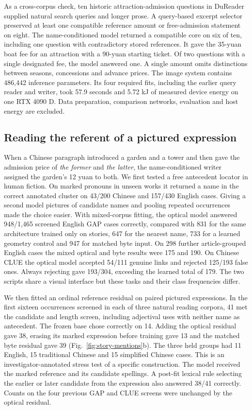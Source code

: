 \documentclass[12pt,a4paper]{article}
\providecommand{\DIFadd}[1]{{\protect\color{blue} \sf #1}} %
\begin{document}
\DIFadd{As a cross-corpus check, ten historic attraction-admission questions in DuReader supplied natural search queries and longer prose. A query-based excerpt selector preserved at least one compatible reference amount or free-admission statement on eight. The name-conditioned model returned a compatible core on six of ten, including one question with contradictory stored references. It gave the 35-yuan boat fee for an attraction with a 90-yuan starting ticket. Of two questions with a single designated fee, the model answered one. A single amount omits distinctions between seasons, concessions and advance prices. The image system contains 486,442 inference parameters. Its four required fits, including the earlier query reader and writer, took 57.9 seconds and 5.72 kJ of measured device energy on one RTX 4090 D. Data preparation, comparison networks, evaluation and host energy are excluded.
}

\subsection*{\DIFadd{Reading the referent of a pictured expression}}
\DIFadd{When a Chinese paragraph introduced a garden and a tower and then gave the admission price of \emph{the former} and \emph{the latter}, the name-conditioned writer assigned the garden's 12 yuan to both. We first tested a free antecedent locator in human fiction. On marked pronouns in unseen works it returned a name in the correct annotated cluster on 43/200 Chinese and 157/430 English cases. Giving a second model pictures of candidate names and pooling repeated occurrences made the choice easier. With mixed-corpus fitting, the optical model answered 948/1,465 screened English GAP cases correctly, compared with 831 for the same architecture trained only on stories, 647 for the nearest name, 733 for a learned geometry control and 947 for matched byte input. On 298 further article-grouped English cases the mixed optical and byte results were 175 and 190. On Chinese CLUE the optical model accepted 54/111 genuine links and rejected 125/193 false ones. Always rejecting gave 193/304, exceeding the learned total of 179. The two scripts share a visual interface but these tasks and their class frequencies differ.
}

\DIFadd{We then fitted an ordinal reference residual on paired pictured expressions. In the first sixteen occurrences screened in each of three natural reading corpora, 41 met the candidate and length screen, including adjectival uses with neither name as antecedent. The frozen base chose correctly on 14. Adding the optical residual gave 38, erasing its marked expression before training gave 13 and the matched byte residual gave 39 (Fig.~\ref{fig:story-mentions}b). The three held groups had 11 English, 15 traditional Chinese and 15 simplified Chinese cases. This is an investigator-annotated stress test of a specific construction. The model received the marked reference and its candidate spellings. A post-fit lexical rule selecting the earlier or later candidate from the expression also answered 38/41 correctly. Counts on the four previous GAP and CLUE screens were unchanged by the optical residual.
}
\end{document}
